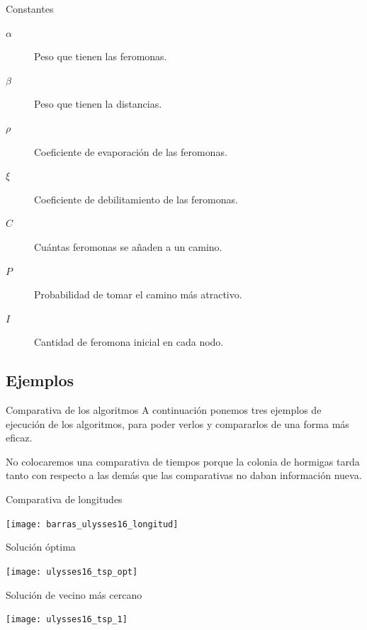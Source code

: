 \begin{frame}{Constantes}
\begin{description}
  \item[$\alpha$] Peso que tienen las feromonas.
  \item[$\beta$] Peso que tienen la distancias.
  \item[$\rho$] Coeficiente de evaporación de las feromonas.
  \item[$\xi$] Coeficiente de debilitamiento de las feromonas.
  \item[$C$] Cuántas feromonas se añaden a un camino.
  \item[$P$] Probabilidad de tomar el camino más atractivo.
  \item[$I$] Cantidad de feromona inicial en cada nodo.
\end{description}
\end{frame}

\subsection{Ejemplos}
\begin{frame}{Comparativa de los algoritmos}
  A continuación ponemos tres ejemplos de ejecución de los algoritmos, para poder verlos y compararlos de una forma más eficaz.
  
  No colocaremos una comparativa de tiempos porque la colonia de hormigas tarda tanto con respecto a las demás que las comparativas no daban información nueva.
\end{frame}

\begin{frame}{Comparativa de longitudes}
	\begin{center}
		\texttt{[image: barras\_ulysses16\_longitud]}
	\end{center}
\end{frame}

\begin{frame}{Solución óptima}
\begin{center}
	\texttt{[image: ulysses16\_tsp\_opt]}
\end{center}
\end{frame}

\begin{frame}{Solución de vecino más cercano}
	\begin{center}
		\texttt{[image: ulysses16\_tsp\_1]}
	\end{center}
\end{frame}

